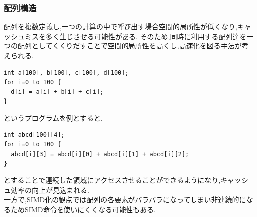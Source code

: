 \subsubsection{配列構造}
配列を複数定義し,一つの計算の中で呼び出す場合空間的局所性が低くなり,キャッシュミスを多く生じさせる可能性がある.
そのため,同時に利用する配列達を一つの配列としてくくりだすことで空間的局所性を高くし,高速化を図る手法が考えられる.\\
{\footnotesize
\begin{lstlisting}[numbers=none]
int a[100], b[100], c[100], d[100];
for i=0 to 100 {
  d[i] = a[i] + b[i] + c[i];
}
\end{lstlisting}
}
というプログラムを例とすると,
{\footnotesize
\begin{lstlisting}[numbers=none]
int abcd[100][4];
for i=0 to 100 {
  abcd[i][3] = abcd[i][0] + abcd[i][1] + abcd[i][2];
}
\end{lstlisting}
}
とすることで連続した領域にアクセスさせることができるようになり,キャッシュ効率の向上が見込まれる.\\
一方で,SIMD化の観点では配列の各要素がバラバラになってしまい非連続的になるためSIMD命令を使いにくくなる可能性もある.\\

